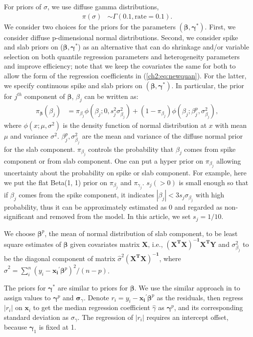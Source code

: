 \documentclass[12pt]{article}
\begin{document}
For priors of $\sigma$, we use diffuse gamma distributions,
\begin{align*}
  \pi(\sigma) & \sim \Gamma(0.1, \mbox{rate} = 0.1).
\end{align*}
We consider two choices for the priors for the parameters
$(\bm{\beta}, \bm{\gamma}^{*})$.  First, we consider diffuse p-dimensional
normal distributions.  Second, we consider spike and slab priors on
($\bm \beta, \bm \gamma^{*}$) as an alternative that can do shrinkage
and/or variable selection on both quantile regression parameters and
heterogeneity parameters and improve efficiency; note that we keep the
covariates the same for both to allow the form of the regression
coefficients in (\ref{ch2:eq:newquan}).  For the latter, we specify
continuous spike and slab priors \citep{george1993}
on $(\bm \beta, \bm \gamma^{*})$.
In particular, the prior for $j^{th}$ component of $\bm \beta$, $\beta_j$ can be written as:
\begin{align*}
  \pi_{\bm \beta} (\beta_j) &= \pi_{\beta_j} \phi(\beta_j; 0, s_j^2 \sigma_{\beta_j}^2) + (1- \pi_{\beta_j}) \phi(\beta_j; \beta_j^p, \sigma_{\beta_j}^2),
\end{align*}
where $\phi(x; \mu, \sigma^2)$ is the density function of normal distribution at $x$ with mean $\mu$ and variance $\sigma^2$.
$\beta_j^p, \sigma_{\beta_j}^2$ are the mean and variance of the diffuse normal prior for the slab component.
$\pi_{\beta_j}$ controls the probability that $\beta_j$ comes from spike component or from slab component.
One can put a hyper prior on $\pi_{\beta_j}$ allowing uncertainty about the probability on spike or slab component.
For example, here we put the flat Beta(1, 1) prior on  $\pi_{\beta_j}$ and $\pi_{\gamma_j}$.
$s_j (>0)$ is small enough so that if $\beta_j$ comes from the spike component, it indicates $|\beta_j | < 3 s_j\sigma_{\beta_j}$ with high probability,
thus it can be approximately estimated as 0 and regarded as non-significant and removed from the model.
In this article, we set $s_j = 1/10$.

We choose $\bm \beta^p$, the mean of normal distribution of slab component,
to be least square estimates of $\bm \beta$ given covariates matrix $\bm X$,
i.e., $\bm{(X^TX)^{-1}X^TY}$ and $\sigma_{\beta_j}^2$ to be the diagonal component of matrix $\hat{\sigma}^2 \bm{(X^TX)^{-1}}$,
where $\hat{\sigma}^2 = \sum_i^n (y_i - \bm{x_i}^{\prime} \bm \beta^p)^2/(n - p)$.

The priors for $\bm \gamma^{*}$ are similar to priors for $\bm \beta$.
We use the similar approach in \citet{he1998} to assign values to $\bm \gamma^p$ and $\bm \sigma_{\gamma}$.
Denote $r_i = y_i - \bm{x_i}^{\prime}\bm \beta^p$ as the residuals, then regress $|r_i|$ on $\bm x_i$ to get the median regression coefficient $\hat{\gamma}$ as $\bm \gamma^p$, and its corresponding standard deviation as $\sigma_{\gamma}$.
The regression of $|r_i|$ requires an intercept offset, because $\bm \gamma_1$ is fixed at 1.
\end{document}
